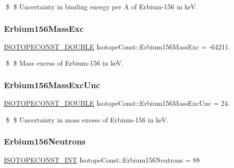 \$ \$ Uncertainty in binding energy per A of Erbium-\/156 in keV. \mbox{\label{group___isotope_const-_erbium-_er156_ga3e699a39d5237de983d68df562ef56be}} 
\subsubsection{\texorpdfstring{Erbium156\+Mass\+Exc}{Erbium156MassExc}}
{\footnotesize\ttfamily \mbox{\hyperlink{group___isotope_const-_macros_ga8f45a7272ce02c0b4c65c44636ed719a}{I\+S\+O\+T\+O\+P\+E\+C\+O\+N\+S\+T\+\_\+\+D\+O\+U\+B\+LE}} Isotope\+Const\+::\+Erbium156\+Mass\+Exc = -\/64211.}

\$ \$ Mass excess of Erbium-\/156 in keV. \mbox{\label{group___isotope_const-_erbium-_er156_ga81ee69aa1dd473ea63046e640407612f}} 
\subsubsection{\texorpdfstring{Erbium156\+Mass\+Exc\+Unc}{Erbium156MassExcUnc}}
{\footnotesize\ttfamily \mbox{\hyperlink{group___isotope_const-_macros_ga8f45a7272ce02c0b4c65c44636ed719a}{I\+S\+O\+T\+O\+P\+E\+C\+O\+N\+S\+T\+\_\+\+D\+O\+U\+B\+LE}} Isotope\+Const\+::\+Erbium156\+Mass\+Exc\+Unc = 24.}

\$ \$ Uncertainty in mass excess of Erbium-\/156 in keV. \mbox{\label{group___isotope_const-_erbium-_er156_gabe76bbcc12b1941df7e72c012f61c8a2}} 
\subsubsection{\texorpdfstring{Erbium156\+Neutrons}{Erbium156Neutrons}}
{\footnotesize\ttfamily \mbox{\hyperlink{group___isotope_const-_macros_ga5f18360b3e99483a35c32d789e62621c}{I\+S\+O\+T\+O\+P\+E\+C\+O\+N\+S\+T\+\_\+\+I\+NT}} Isotope\+Const\+::\+Erbium156\+Neutrons = 88}

